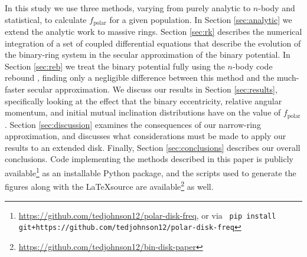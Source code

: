 \documentclass[twocolumn,linenumbers]{aastex631}
\newcommand\ghurl[0]{\url{https://github.com/tedjohnson12/bin-disk-paper}}
\newcommand\codeurl[0]{https://github.com/tedjohnson12/polar-disk-freq}
\begin{document}
In this study we use three methods, varying from purely analytic to $n$-body and statistical, to calculate $f_\text{polar}$ for a given population. In Section \ref{sec:analytic} we extend the analytic work to massive rings. Section \ref{sec:rk} 
describes the numerical integration of a set of coupled differential equations that describe the evolution of the binary-ring system in the secular approximation of the binary potential. In Section \ref{sec:reb} we treat the binary potential fully using the $n$-body code {\sc rebound} \citep{rebound}, finding only a negligible difference between this method and the much-faster secular approximation. We discuss our results in Section \ref{sec:results}, specifically looking at the effect that the binary eccentricity, relative angular momentum, and initial mutual inclination distributions have on the value of $f_\text{polar}$. Section \ref{sec:discussion} examines the consequences of our narrow-ring approximation, and discusses what considerations must be made to apply our results to an extended disk. Finally, Section \ref{sec:conclusions} describes our overall conclusions. Code implementing the methods described in this paper is publicly available\footnote{\url{\codeurl}, or via \hfill \break \texttt{ pip install git+\codeurl} } as an installable Python package, and the scripts used to generate the figures along with the \LaTeX \space source are available\footnote{\ghurl} as well.
\end{document}
